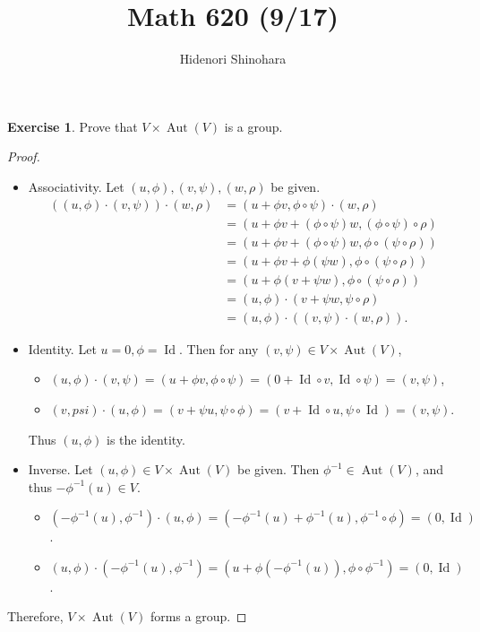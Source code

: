 \documentclass[12pt, psamsfonts]{amsart}
\theoremstyle{definition}
\newtheorem*{exer}{Exercise}
\theoremstyle{remark}
\DeclareMathOperator{\Aut}{Aut}
\DeclareMathOperator{\Id}{Id}
\numberwithin{equation}{section}
\begin{document}
\title{Math 620 (9/17)}
\author{Hidenori Shinohara}
\maketitle

\begin{exer}
  Prove that $V \times \Aut(V)$ is a group.
\end{exer}

\begin{proof}
  $ $
  \begin{itemize}
    \item
      Associativity.
      Let $(u, \phi), (v, \psi), (w, \rho)$ be given.
      \begin{align*}
        ((u, \phi) \cdot (v, \psi)) \cdot (w, \rho)
          &= (u + \phi v, \phi \circ \psi) \cdot (w, \rho) \\
          &= (u + \phi v + (\phi \circ \psi) w, (\phi \circ \psi) \circ \rho) \\
          &= (u + \phi v + (\phi \circ \psi) w, \phi \circ (\psi \circ \rho)) \\
          &= (u + \phi v + \phi(\psi w), \phi \circ (\psi \circ \rho)) \\
          &= (u + \phi(v + \psi w), \phi \circ (\psi \circ \rho)) \\
          &= (u, \phi) \cdot (v + \psi w, \psi \circ \rho) \\
          &= (u, \phi) \cdot ((v, \psi) \cdot (w, \rho)).
      \end{align*}
    \item
      Identity.
      Let $u = 0, \phi = \Id$.
      Then for any $(v, \psi) \in V \times \Aut(V)$,
      \begin{itemize}
        \item
          $(u, \phi) \cdot (v, \psi) = (u + \phi v, \phi \circ \psi) = (0 + \Id \circ v, \Id \circ \psi) = (v, \psi)$,
        \item
          $(v, psi) \cdot (u, \phi) = (v + \psi u, \psi \circ \phi) = (v + \Id \circ u, \psi \circ \Id) = (v, \psi)$.
      \end{itemize}

      Thus $(u, \phi)$ is the identity.
    \item
      Inverse.
      Let $(u, \phi) \in V \times \Aut(V)$ be given.
      Then $\phi^{-1} \in \Aut(V)$, and thus $-\phi^{-1}(u) \in V$.
      \begin{itemize}
        \item
          $(-\phi^{-1}(u), \phi^{-1}) \cdot (u, \phi) = (-\phi^{-1}(u) + \phi^{-1}(u), \phi^{-1} \circ \phi) = (0, \Id)$.
        \item
          $(u, \phi) \cdot (-\phi^{-1}(u), \phi^{-1}) = (u + \phi(-\phi^{-1}(u)), \phi \circ \phi^{-1}) = (0, \Id)$.
      \end{itemize}
  \end{itemize}
  Therefore, $V \times \Aut(V)$ forms a group.
\end{proof}
\end{document}
